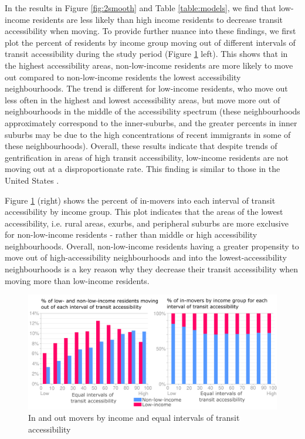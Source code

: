 In the results in Figure \ref{fig:2smooth} and Table \ref{table:models}, we find that low-income residents are less likely than high income residents to decrease transit accessibility when moving. To provide further nuance into these findings, we first plot the percent of residents by income group moving out of different intervals of transit accessibility during the study period (Figure \ref{fig:res_acc_inc} left). This shows that in the highest accessibility areas, non-low-income residents are more likely to move out compared to non-low-income residents the lowest accessibility neighbourhoods. The trend is different for low-income residents, who move out less often in the highest and lowest accessibility areas, but move more out of neighbourhoods in the middle of the accessibility spectrum (these neighbourhoods approximately correspond to the inner-suburbs, and the greater percents in inner suburbs may be due to the high concentrations of recent immigrants in some of these neighbourhoods). Overall, these results indicate that despite trends of gentrification in areas of high transit accessibility, low-income residents are not moving out at a disproportionate rate. This finding is similar to those in the United States \cite{freeman_displacement_2005,delmelle_new_2020}. 

Figure \ref{fig:res_acc_inc} (right) shows the percent of in-movers into each interval of transit accessibility by income group. This plot indicates that the areas of the lowest accessibility, i.e. rural areas, exurbs, and peripheral suburbs are more exclusive for non-low-income residents - rather than middle or high accessibility neighbourhoods. Overall, non-low-income residents having a greater propensity to move out of high-accessibility neighbourhoods and into the lowest-accessibility neighbourhoods is a key reason why they decrease their transit accessibility when moving more than low-income residents.


\begin{figure}[H]
	\centering
	\includegraphics[width=1\linewidth]{figures/res_acc_inc_bars.png}
	\caption{{In and out movers by income and equal intervals of transit accessibility}}
	\label{fig:res_acc_inc}
\end{figure}





